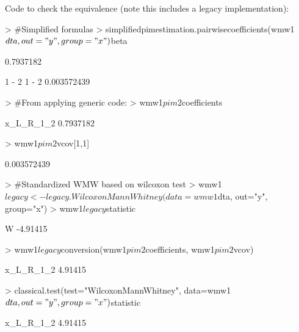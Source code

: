 \documentclass[12pt]{article}
\begin{document}
Code to check the equivalence (note this includes a legacy implementation):
\begin{Schunk}
\begin{Sinput}
> 	#Simplified formulas
> 	simplifiedpimestimation.pairwisecoefficients(wmw1$dta, out="y", group="x")$beta
\end{Sinput}
\begin{Soutput}
[1] 0.7937182
\end{Soutput}
\begin{Soutput}
            1 - 2
1 - 2 0.003572439
\end{Soutput}
\begin{Sinput}
> 	#From applying generic code:
> 	wmw1$pim2$coefficients
\end{Sinput}
\begin{Soutput}
x_L_R_1_2 
0.7937182 
\end{Soutput}
\begin{Sinput}
> 	wmw1$pim2$vcov[1,1]
\end{Sinput}
\begin{Soutput}
[1] 0.003572439
\end{Soutput}
\begin{Sinput}
> 	#Standardized WMW based on wilcoxon test
> 	wmw1$legacy<-legacy.WilcoxonMannWhitney(data=wmw1$dta, out="y", group="x")
> 	wmw1$legacy$statistic
\end{Sinput}
\begin{Soutput}
       W 
-4.91415 
\end{Soutput}
\begin{Sinput}
> 	wmw1$legacy$conversion(wmw1$pim2$coefficients, wmw1$pim2$vcov)
\end{Sinput}
\begin{Soutput}
x_L_R_1_2 
  4.91415 
\end{Soutput}
\begin{Sinput}
> 	classical.test(test="WilcoxonMannWhitney", data=wmw1$dta, out="y", group="x")$statistic
\end{Sinput}
\begin{Soutput}
x_L_R_1_2 
  4.91415 
\end{Soutput}
\end{Schunk}
\end{document}
